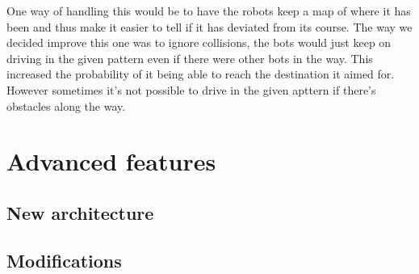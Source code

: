 \documentclass[12pt, a4paper]{article}
\begin{document}
One way of handling this would be to have the robots keep a map of where it has been and thus make it easier to tell if it has deviated from its course. The way we decided improve this one was to ignore collisions, the bots would just keep on driving in the given pattern even if there were other bots in the way. This increased the probability of it being able to reach the destination it aimed for. However sometimes it's not possible to drive in the given apttern if there's obstacles along the way.\\



\section{Advanced features}

\subsection{New architecture}
\subsection{Modifications}
\end{document}
